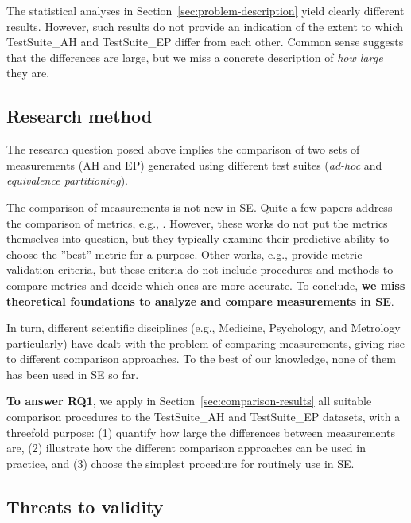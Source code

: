 The statistical analyses in Section~\ref{sec:problem-description} yield clearly different results. However, such results do not provide an indication of the extent to which TestSuite\_AH and TestSuite\_EP differ from each other. Common sense suggests that the differences are large, but we miss a concrete description of \textit{how large} they are.

\subsection{Research method}\label{sec:method}

The research question posed above implies the comparison of two sets of measurements (AH and EP) generated using different test suites (\textit{ad-hoc} and \textit{equivalence partitioning}). 

The comparison of measurements is not new in SE. Quite a few papers address the comparison of metrics, e.g., \cite{basili1981evaluating,zhang2007performance,zhao1998comparison,jiang2008comparing,di2007comparing}. However, these works do not put the metrics themselves into question, but they typically examine their predictive ability to choose the ''best'' metric for a purpose. Other works, e.g., \cite{meneely2012validating} provide metric validation criteria, but these criteria do not include procedures and methods to compare metrics and decide which ones are more accurate. To conclude, \textbf{we miss theoretical foundations to analyze and compare measurements in SE}.

In turn, different scientific disciplines (e.g., Medicine, Psychology, and Metrology particularly) have dealt with the problem of comparing measurements, giving rise to different comparison approaches. To the best of our knowledge, none of them has been used in SE so far.


\textbf{To answer RQ1}, we apply in Section~\ref{sec:comparison-results} all suitable comparison procedures to the TestSuite\_AH and TestSuite\_EP datasets, with a threefold purpose: (1) quantify how large the differences between measurements are, (2) illustrate how the different comparison approaches can be used in practice, and (3) choose the simplest procedure for routinely use in SE.

\subsection{Threats to validity}\label{sec:threads}

